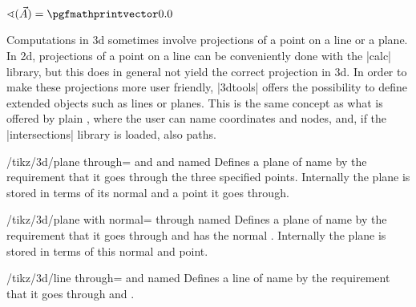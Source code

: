 \documentclass[a4paper,fleqn]{ltxdoc}
\begin{document}
\begin{codeexample}[width=5.2cm,preamble={\usetikzlibrary{3dtools}}]
%
$\sphericalangle(\vec A)=
\pgfmathprintvector\pgfmathresult$
\end{codeexample}


% 


Computations in 3d sometimes involve projections of a point on a line or a
plane. In 2d, projections of a point on a line can be conveniently done with the
|calc| library, but this does in general not yield the correct projection in 3d.
In order to make these projections more user friendly, |3dtools| offers the
possibility to define extended objects such as lines or planes. This is the same
concept as what is offered by plain \tikzname, where  the user can name
coordinates and nodes, and, if the |intersections| library is loaded, also
paths.

\begin{key}{/tikz/3d/plane through= and  and 
named }
    Defines a plane of name  by the requirement that it goes through
	the three specified points. Internally the plane is stored in terms of its
	normal and a point it goes through. 
\end{key}

\begin{key}{/tikz/3d/plane with normal= through  named }
	Defines a plane of name  by the requirement that it goes through
	 and has the normal .  Internally the plane is
	stored in terms of this normal and point. 
\end{key}

\begin{key}{/tikz/3d/line through= and  named }
	Defines a line of name  by the requirement that it goes through
	 and .   
\end{key}
\end{document}
